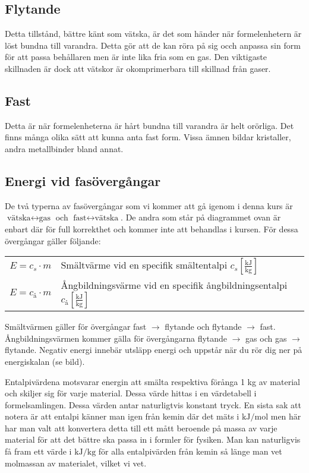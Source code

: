 \subsection*{Flytande}
Detta tillstånd, bättre känt som vätska, är det som händer när formelenhetern är löst bundna till varandra. Detta gör att de kan röra på sig occh anpassa sin form för att passa behållaren men är inte lika fria som en gas. Den viktigaste skillnaden är dock att vätskor är okomprimerbara till skillnad från gaser.

\subsection*{Fast}
Detta är när formelenheterna är hårt bundna till varandra är helt orörliga. Det finns många olika sätt att kunna anta fast form. Vissa ämnen bildar kristaller, andra metallbinder bland annat.

\subsection{Energi vid fasövergångar}
De två typerna av fasövergångar som vi kommer att gå igenom i denna kurs är \linebreak $\text{vätska} \longleftrightarrow \text{gas}$ och $\text{fast} \longleftrightarrow \text{vätska}$. De andra som står på diagrammet ovan är enbart där för full korrekthet och kommer inte att behandlas i kursen. För dessa övergångar gäller följande:
\begin{center}
    \begin{tabular}{c l}
        $E = c_s \cdot m$            & Smältvärme vid en specifik smältentalpi $c_s \left[ \frac{\mathrm{kJ}}{\mathrm{kg}} \right]$                           \\
        $E = c_{\textit{å}} \cdot m$ & Ångbildningsvärme vid en specifik ångbildningsentalpi  $c_{\textit{å}} \left[ \frac{\mathrm{kJ}}{\mathrm{kg}} \right]$
    \end{tabular}
\end{center}
Smältvärmen gäller för övergångar fast $\to$ flytande och flytande $\to$ fast. Ångbildningsvärmen kommer gälla för övergångarna flytande $\to$ gas och gas $\to$ flytande. Negativ energi innebär utsläpp energi och uppstår när du rör dig ner på energiskalan (se bild).

Entalpivärdena motsvarar energin att smälta respektiva förånga 1 kg av material och skiljer sig för varje material. Dessa värde hittas i en värdetabell i formelsamlingen. Dessa värden antar naturligtvis konstant tryck. En sista sak att notera är att entalpi känner man igen från kemin där det mäts i $\mathrm{kJ/mol}$ men här har man valt att konvertera detta till ett mått beroende på massa av varje material för att det bättre ska passa in i formler för fysiken. Man kan naturligvis få fram ett värde i $\mathrm{kJ/kg}$ för alla entalpivärden från kemin så länge man vet molmassan av materialet, vilket vi vet.